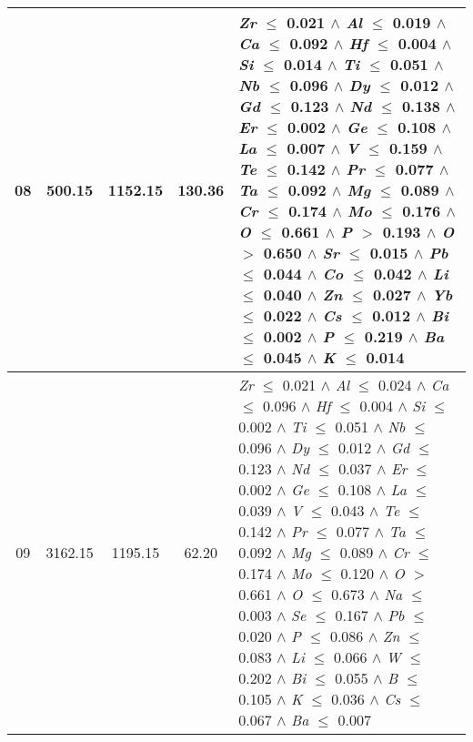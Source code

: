 \begin{table}[!htbp]
\begin{tabular}{ccccm{}}
		\hline
		08 & 500.15 & 1152.15 & 130.36 & \textit{Zr} $\le$ 0.021 $\wedge$ \textit{Al} $\le$ 0.019 $\wedge$ \textit{Ca} $\le$ 0.092 $\wedge$ \textit{Hf} $\le$ 0.004 $\wedge$ \textit{Si} $\le$ 0.014 $\wedge$ \textit{Ti} $\le$ 0.051 $\wedge$ \textit{Nb} $\le$ 0.096 $\wedge$ \textit{Dy} $\le$ 0.012 $\wedge$ \textit{Gd} $\le$ 0.123 $\wedge$ \textit{Nd} $\le$ 0.138 $\wedge$ \textit{Er} $\le$ 0.002 $\wedge$ \textit{Ge} $\le$ 0.108 $\wedge$ \textit{La} $\le$ 0.007 $\wedge$ \textit{V} $\le$ 0.159 $\wedge$ \textit{Te} $\le$ 0.142 $\wedge$ \textit{Pr} $\le$ 0.077 $\wedge$ \textit{Ta} $\le$ 0.092 $\wedge$ \textit{Mg} $\le$ 0.089 $\wedge$ \textit{Cr} $\le$ 0.174 $\wedge$ \textit{Mo} $\le$ 0.176 $\wedge$ \textit{O} $\le$ 0.661 $\wedge$ \textit{P} $>$ 0.193 $\wedge$ \textit{O} $>$ 0.650 $\wedge$ \textit{Sr} $\le$ 0.015 $\wedge$ \textit{Pb} $\le$ 0.044 $\wedge$ \textit{Co} $\le$ 0.042 $\wedge$ \textit{Li} $\le$ 0.040 $\wedge$ \textit{Zn} $\le$ 0.027 $\wedge$ \textit{Yb} $\le$ 0.022 $\wedge$ \textit{Cs} $\le$ 0.012 $\wedge$ \textit{Bi} $\le$ 0.002 $\wedge$ \textit{P} $\le$ 0.219 $\wedge$ \textit{Ba} $\le$ 0.045 $\wedge$ \textit{K} $\le$ 0.014\\
		\hline
		09 & 3162.15 & 1195.15 & 62.20 & \textit{Zr} $\le$ 0.021 $\wedge$ \textit{Al} $\le$ 0.024 $\wedge$ \textit{Ca} $\le$ 0.096 $\wedge$ \textit{Hf} $\le$ 0.004 $\wedge$ \textit{Si} $\le$ 0.002 $\wedge$ \textit{Ti} $\le$ 0.051 $\wedge$ \textit{Nb} $\le$ 0.096 $\wedge$ \textit{Dy} $\le$ 0.012 $\wedge$ \textit{Gd} $\le$ 0.123 $\wedge$ \textit{Nd} $\le$ 0.037 $\wedge$ \textit{Er} $\le$ 0.002 $\wedge$ \textit{Ge} $\le$ 0.108 $\wedge$ \textit{La} $\le$ 0.039 $\wedge$ \textit{V} $\le$ 0.043 $\wedge$ \textit{Te} $\le$ 0.142 $\wedge$ \textit{Pr} $\le$ 0.077 $\wedge$ \textit{Ta} $\le$ 0.092 $\wedge$ \textit{Mg} $\le$ 0.089 $\wedge$ \textit{Cr} $\le$ 0.174 $\wedge$ \textit{Mo} $\le$ 0.120 $\wedge$ \textit{O} $>$ 0.661 $\wedge$ \textit{O} $\le$ 0.673 $\wedge$ \textit{Na} $\le$ 0.003 $\wedge$ \textit{Se} $\le$ 0.167 $\wedge$ \textit{Pb} $\le$ 0.020 $\wedge$ \textit{P} $\le$ 0.086 $\wedge$ \textit{Zn} $\le$ 0.083 $\wedge$ \textit{Li} $\le$ 0.066 $\wedge$ \textit{W} $\le$ 0.202 $\wedge$ \textit{Bi} $\le$ 0.055 $\wedge$ \textit{B} $\le$ 0.105 $\wedge$ \textit{K} $\le$ 0.036 $\wedge$ \textit{Cs} $\le$ 0.067 $\wedge$ \textit{Ba} $\le$ 0.007\\
		\hline

\end{tabular}
\end{table}
